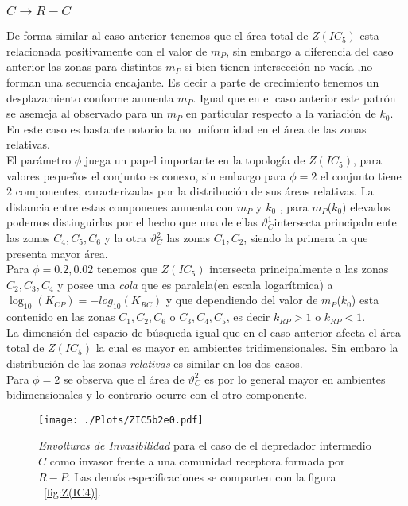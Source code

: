 \subsubsection{$C \to R-C$}
De forma similar al caso anterior tenemos que el \'area total de $Z(IC_5)$ esta relacionada positivamente con el valor de $m_P$, sin embargo a diferencia del caso anterior las zonas para distintos $m_P$ si bien tienen intersecci\'on no vac\'ia ,no forman una secuencia encajante. Es decir a parte de crecimiento tenemos un desplazamiento conforme aumenta $m_P$. Igual que en el caso anterior este patr\'on se asemeja al observado para un $m_P$ en particular respecto a la variaci\'on de $k_0$. \\
En este caso es bastante notorio la no uniformidad en el \'area de las zonas relativas.\\

El par\'ametro $\phi$ juega un papel importante en la topolog\'ia de $Z(IC_5)$, para valores peque\~nos el conjunto es conexo, sin embargo para $\phi = 2$ el conjunto tiene 2 componentes, caracterizadas por la distribuci\'on de sus \'areas relativas. La distancia entre estas componenes aumenta con $m_P$ y $k_0$ , para $m_P$($k_0$) elevados podemos distinguirlas por el hecho que una de ellas $\vartheta_C^1$intersecta principalmente las zonas $C_4,C_5,C_6$ y la otra $\vartheta_C^2$ las zonas $C_1,C_2$, siendo la primera la que presenta mayor \'area. \\
Para $\phi = 0.2 ,0.02$  tenemos que $Z(IC_5)$ intersecta principalmente a las zonas $C_2,C_3,C_4$ y posee una \emph{cola} que es paralela(en escala logar\'itmica) a $\log_{10}(K_{CP}) = -log_{10}(K_{RC})$ y que dependiendo del valor de $m_P$($k_0$) esta contenido en las zonas $C_1,C_2,C_6$ o $C_3,C_4,C_5$, es decir $k_{RP} > 1$ o $k_{RP}<1$. \\

La dimensi\'on del espacio de b\'usqueda igual que en el caso anterior afecta el \'area total de $Z(IC_5)$ la cual es mayor en ambientes tridimensionales. Sin embaro la distribuci\'on de las zonas \emph{relativas} es similar en los dos casos. \\
Para $\phi = 2$ se observa que el \'area de $\vartheta_C^2$ es por lo general mayor en ambientes bidimensionales y lo contrario ocurre con el otro componente.

\begin{figure}
  \centering
  \texttt{[image: ./Plots/ZIC5b2e0.pdf]}
  \caption[Env $Z(IC5)$]{\emph{Envolturas de Invasibilidad} para el caso de el depredador intermedio $C$ como invasor frente a una comunidad receptora formada por $R-P$. Las dem\'as especificaciones se comparten con la figura ~\ref{fig:Z(IC4)}.}
\end{figure}





















